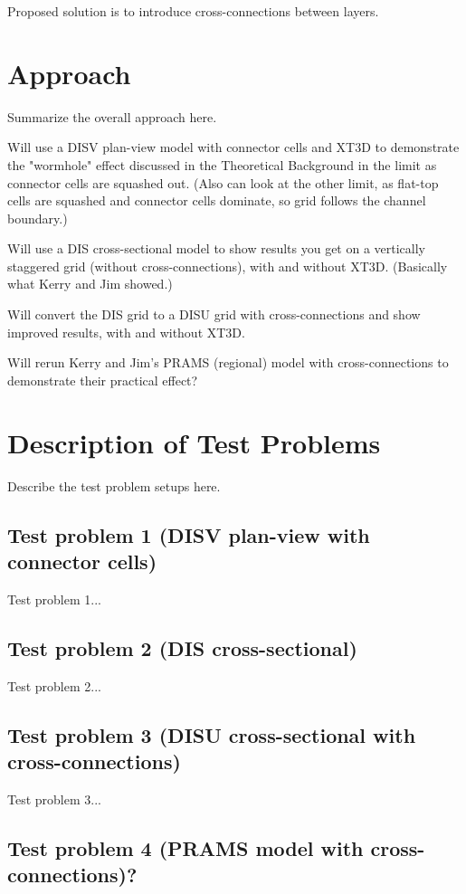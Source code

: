 \documentclass{article}
\begin{document}
Proposed solution is to introduce cross-connections between layers.

\section{Approach}

Summarize the overall approach here.

Will use a DISV plan-view model with connector cells and XT3D to demonstrate the "wormhole" effect discussed in the Theoretical Background in the limit as connector cells are squashed out. (Also can look at the other limit, as flat-top cells are squashed and connector cells dominate, so grid follows the channel boundary.)

Will use a DIS cross-sectional model to show results you get on a vertically staggered grid (without cross-connections), with and without XT3D.  (Basically what Kerry and Jim showed.)

Will convert the DIS grid to a DISU grid with cross-connections and show improved results, with and without XT3D.

Will rerun Kerry and Jim's PRAMS (regional) model with cross-connections to demonstrate their practical effect?

\section{Description of Test Problems}

Describe the test problem setups here.

\subsection{Test problem 1 (DISV plan-view with connector cells)}

Test problem 1...

\subsection{Test problem 2 (DIS cross-sectional)}

Test problem 2...

\subsection{Test problem 3 (DISU cross-sectional with cross-connections)}

Test problem 3...

\subsection{Test problem 4 (PRAMS model with cross-connections)?}
\end{document}
